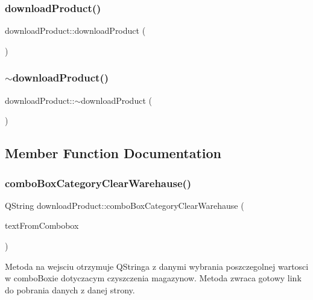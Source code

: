 \subsubsection{\texorpdfstring{download\+Product()}{downloadProduct()}}
{\footnotesize\ttfamily download\+Product\+::download\+Product (\begin{DoxyParamCaption}{ }\end{DoxyParamCaption})}

\mbox{\label{classdownload_product_a606f11fe90d3415abb7a20df5ac4209b}} 
\subsubsection{\texorpdfstring{$\sim$download\+Product()}{~downloadProduct()}}
{\footnotesize\ttfamily download\+Product\+::$\sim$download\+Product (\begin{DoxyParamCaption}{ }\end{DoxyParamCaption})}



\subsection{Member Function Documentation}
\mbox{\label{classdownload_product_a2686f055c79460d3ce1735b98df2cd12}} 
\subsubsection{\texorpdfstring{combo\+Box\+Category\+Clear\+Warehause()}{comboBoxCategoryClearWarehause()}}
{\footnotesize\ttfamily Q\+String download\+Product\+::combo\+Box\+Category\+Clear\+Warehause (\begin{DoxyParamCaption}\item[{Q\+String}]{text\+From\+Combobox }\end{DoxyParamCaption})}

Metoda na wejsciu otrzymuje Q\+Stringa z danymi wybrania poszczegolnej wartosci w combo\+Boxie dotyczacym czyszczenia magazynow. Metoda zwraca gotowy link do pobrania danych z danej strony. \mbox{\label{classdownload_product_a31f84f4939cabad7c3150f0ce563d284}} 
